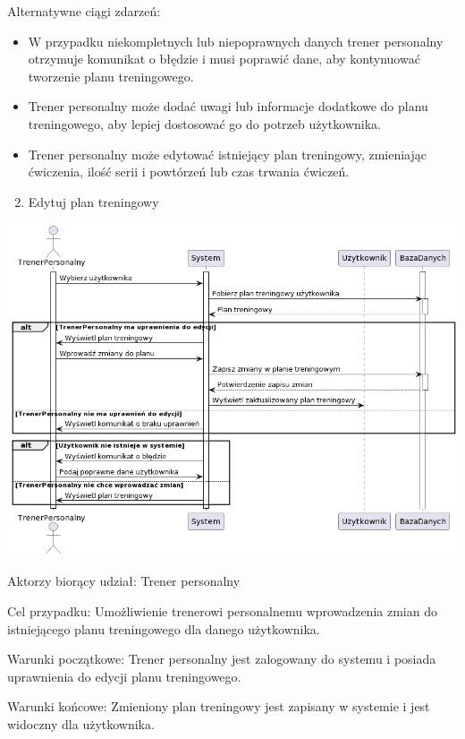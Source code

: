 \documentclass[
]{article}
\providecommand{\tightlist}{%
  \setlength{\itemsep}{0pt}\setlength{\parskip}{0pt}}
\begin{document}
{Alternatywne ciągi zdarzeń:}

\begin{itemize}
\tightlist
\item
  {W przypadku niekompletnych lub niepoprawnych danych trener personalny
  otrzymuje komunikat o błędzie i musi poprawić dane, aby kontynuować
  tworzenie planu treningowego.}
\item
  {Trener personalny może dodać uwagi lub informacje dodatkowe do planu
  treningowego, aby lepiej dostosować go do potrzeb użytkownika.}
\item
  {Trener personalny może edytować istniejący plan treningowy,
  zmieniając ćwiczenia, ilość serii i powtórzeń lub czas trwania
  ćwiczeń.}
\end{itemize}

{}

\begin{enumerate}
\setcounter{enumi}{1}
\tightlist
\item
  {Edytuj plan treningowy}
\end{enumerate}

{\includegraphics{diagrams/sequence/edycja_planu_treningowego.png}}

{Aktorzy biorący udział: Trener personalny}

{Cel przypadku: Umożliwienie trenerowi personalnemu wprowadzenia zmian
do istniejącego planu treningowego dla danego użytkownika.}

{Warunki początkowe: Trener personalny jest zalogowany do systemu i
posiada uprawnienia do edycji planu treningowego.}

{Warunki końcowe: Zmieniony plan treningowy jest zapisany w systemie i
jest widoczny dla użytkownika.}
\end{document}
